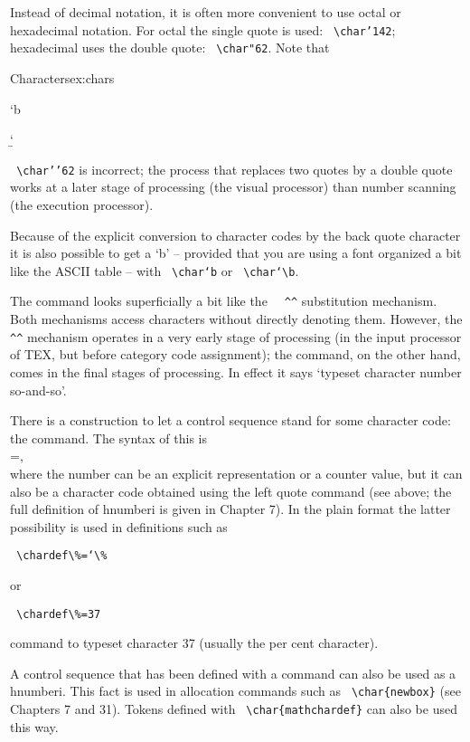 Instead of decimal notation, it is often more convenient to use octal or hexadecimal notation. For
octal the single quote is used: \verb+ \char’142+; hexadecimal uses the double quote: \verb+ \char"62+. Note that

\begin{texexample}{Characters}{ex:chars}
\bgroup
\ttfamily


\char`b

\char`\b

\egroup
\end{texexample}

\verb+ \char’’62+  is incorrect; the process that replaces two quotes by a double quote works at a later
stage of processing (the visual processor) than number scanning (the execution processor).

Because of the explicit conversion to character codes by the back quote character it is also possible
to get a ‘b’ – provided that you are using a font organized a bit like the ASCII table – with \verb+ \char‘b+
or \verb+ \char‘\b+.

The \cmd{\char} command looks superficially a bit like the \verb+  ^^+ substitution mechanism.
Both mechanisms access characters without directly denoting them. However, the \verb+ ^^+ mechanism
operates in a very early stage of processing (in the input processor of TEX, but before category
code assignment); the \cmd{\char} command, on the other hand, comes in the final stages of processing.
In effect it says ‘typeset character number so-and-so’.

\DescribeMacro{\chardef}
There is a construction to let a control sequence stand for some character code: the \cmd{\chardef}
command. The syntax of this is\\
=,\\
where the number can be an explicit representation or a counter value, but it can also be a character
code obtained using the left quote command (see above; the full definition of hnumberi is
given in Chapter 7). In the plain format the latter possibility is used in definitions such as

\verb+ \chardef\%=‘\%+

or 

\verb+ \chardef\%=37   +

command to typeset character 37 (usually the per cent character).

A control sequence that has been defined with a \cmd{\chardef} command can also be used as a hnumberi.
This fact is used in allocation commands such as \verb+ \char{newbox}+ (see Chapters 7 and 31). Tokens defined
with \verb+ \char{mathchardef}+ can also be used this way.


